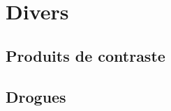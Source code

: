 \section{Divers}
  
\subsection{Produits de contraste}

\begin{boiteCodeTex}{}
  \chemfig{!\ionChelate}
  \chemfig{!\chelateAlcool}
\end{boiteCodeTex}

\subsection{Drogues}

\begin{boiteCodeTex}{}
  \chemfig{!\THC} \qq{}
  \chemfig{!\cocaineHaw}
\end{boiteCodeTex}
